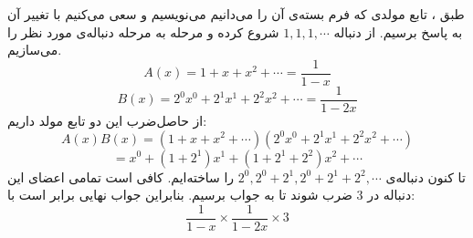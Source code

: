 \p
طبق
،
تابع مولدی که فرم بسته‌ی آن را می‌دانیم می‌نویسیم و سعی می‌کنیم با تغییر آن به پاسخ برسیم. از دنباله
$ 1, 1, 1, \cdots $
شروع کرده و مرحله به مرحله دنباله‌ی مورد نظر را می‌سازیم.
$$A(x) = 1 + x + x^2 + \cdots  = \frac{1}{1-x}$$
$$B(x) = 2^0x^0 + 2^1x^1 + 2^2x^2 + \cdots = \frac{1}{1-2x}$$
از حاصل‌ضرب این دو تابع مولد داریم:
$$A(x)B(x) = (1 + x + x^2 + \cdots)(2^0x^0 + 2^1x^1 + 2^2x^2 + \cdots)$$
$$=x^0 + (1 + 2^1)x^1 + (1 + 2^1 + 2^2)x^2 + \cdots$$
تا کنون دنباله‌ی
$ 2^0, 2^0 + 2^1, 2^0 + 2^1 + 2^2, \cdots $
را ساخته‌ایم. کافی است تمامی اعضای این دنباله در
$3$
ضرب شوند تا به جواب برسیم. بنابراین جواب نهایی برابر است با:
$$\frac{1}{1-x}\times\frac{1}{1-2x}\times3$$